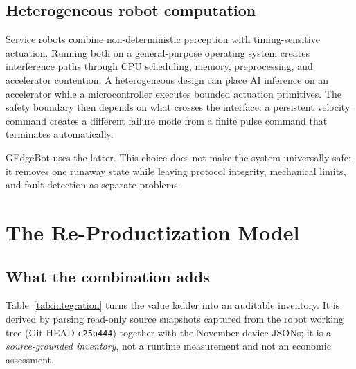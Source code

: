 \documentclass[conference]{IEEEtran}
\newcommand{\code}[1]{\texttt{#1}}
\begin{document}
\subsection{Heterogeneous robot computation}
Service robots combine non-deterministic perception with timing-sensitive actuation. Running both on a general-purpose operating system creates interference paths through CPU scheduling, memory, preprocessing, and accelerator contention. A heterogeneous design can place AI inference on an accelerator while a microcontroller executes bounded actuation primitives. The safety boundary then depends on what crosses the interface: a persistent velocity command creates a different failure mode from a finite pulse command that terminates automatically.

GEdgeBot uses the latter. This choice does not make the system universally safe; it removes one runaway state while leaving protocol integrity, mechanical limits, and fault detection as separate problems.

\section{The Re-Productization Model}


\subsection{What the combination adds}
\label{sec:integration}
Table~\ref{tab:integration} turns the value ladder into an auditable inventory. It is derived by parsing read-only source snapshots captured from the robot working tree (Git HEAD \code{c25b444}) together with the November device JSONs; it is a \emph{source-grounded inventory}, not a runtime measurement and not an economic assessment.
\end{document}
